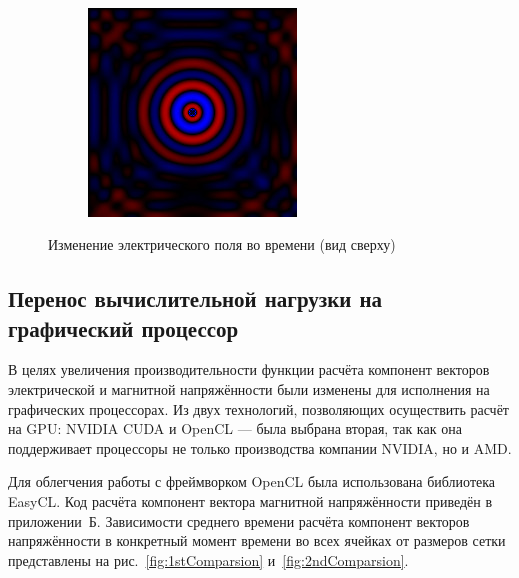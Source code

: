 \begin{figure}[p]
\begin{subfigure}[b]{0.3\textwidth}
    \end{subfigure}
    ~
    \begin{subfigure}[b]{0.3\textwidth}
        \includegraphics[width=\textwidth]{include/graphics/image11}
    \end{subfigure}

    \caption{Изменение электрического поля во времени (вид сверху)}\label{fig:Ezfield}
\end{figure}

\subsection{Перенос вычислительной нагрузки на графический процессор}

В целях увеличения производительности функции расчёта компонент векторов электрической и магнитной напряжённости были изменены
для исполнения на графических процессорах. Из двух технологий, позволяющих осуществить расчёт на GPU: NVIDIA CUDA и OpenCL --- была выбрана
вторая, так как она поддерживает процессоры не только производства компании NVIDIA, но и AMD.

Для облегчения работы с фреймворком OpenCL была использована библиотека EasyCL. Код расчёта компонент вектора магнитной напряжённости
приведён в приложении~Б. Зависимости среднего времени расчёта компонент векторов напряжённости в конкретный момент времени во всех ячейках от размеров сетки представлены на рис.~\ref{fig:1stComparsion} и~\ref{fig:2ndComparsion}.

